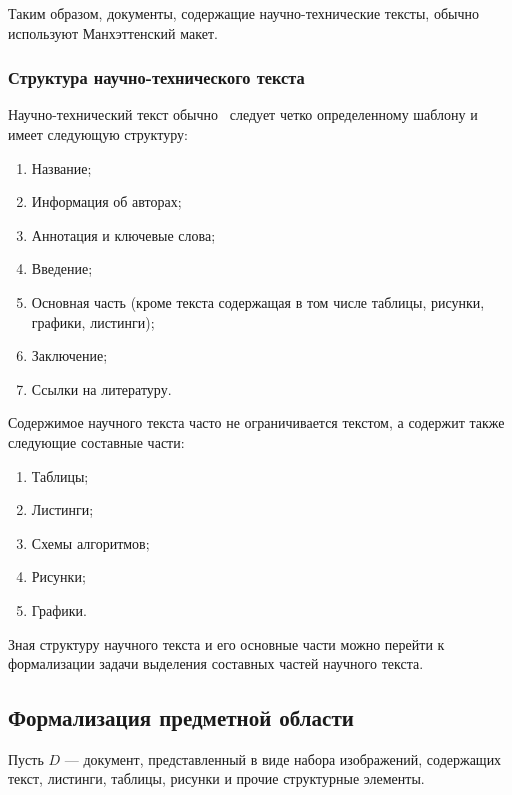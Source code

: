 Таким образом, документы, содержащие научно-технические тексты, обычно используют Манхэттенский макет.

\subsubsection{Структура научно-технического текста}

Научно-технический текст обычно~\cite{butenko2022, romanov2014, raitskaya2019} следует четко определенному шаблону и имеет следующую структуру:
\begin{enumerate}
    \item Название;
    \item Информация об авторах;
    \item Аннотация и ключевые слова;
    \item Введение;
    \item Основная часть (кроме текста содержащая в том числе таблицы, рисунки, графики, листинги);
    \item Заключение;
    \item Ссылки на литературу.
\end{enumerate}

Содержимое научного текста часто не ограничивается текстом, а содержит также следующие составные части:
\begin{enumerate}
    \item Таблицы;
    \item Листинги;
    \item Схемы алгоритмов;
    \item Рисунки;
    \item Графики.
\end{enumerate}

%

Зная структуру научного текста и его основные части можно перейти к формализации задачи выделения составных частей научного текста.

\subsection{Формализация предметной области}

Пусть $ D $ --- документ, представленный в виде набора изображений, содержащих текст, листинги, таблицы, рисунки и прочие структурные элементы.

